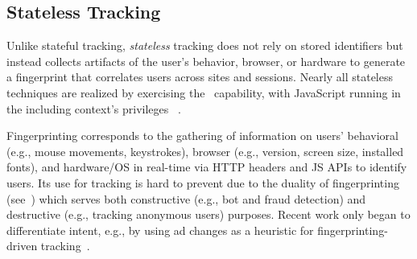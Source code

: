 









\subsection{Stateless Tracking}
\label{sec:stateless-tracking}

Unlike stateful tracking, \textit{stateless} tracking does not rely on stored identifiers but instead collects artifacts of the user's behavior, browser, or hardware to generate a fingerprint that correlates users across sites and sessions.
%
Nearly all stateless techniques are realized by exercising the \symExecution\ capability, with JavaScript running in the including context's privileges \symInclusion\ .


%
Fingerprinting corresponds to the gathering of information on users’ behavioral (e.g., mouse movements, keystrokes), browser (e.g., version, screen size, installed fonts), and hardware/OS in real-time via HTTP headers and JS APIs to identify users.
%
%
Its use for tracking is hard to prevent due to the duality of fingerprinting (see~) which serves both constructive (e.g., bot and fraud detection) and destructive (e.g., tracking anonymous users) purposes. 
%
Recent work only began to differentiate intent, e.g., by using ad changes as a heuristic for fingerprinting-driven tracking~\cite{liuFirstEarlyEvidence2025}.

